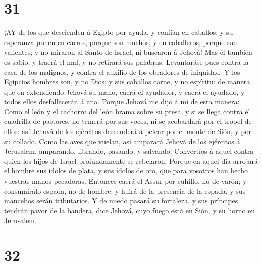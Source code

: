 \hypertarget{section-30}{%
\section{31}\label{section-30}}

 ¡AY de los que descienden á Egipto por ayuda, y confían en
caballos; y su esperanza ponen en carros, porque son muchos, y en
caballeros, porque son valientes; y no miraron al Santo de Israel, ni
buscaron á Jehová!  Mas él también es sabio, y traerá el
mal, y no retirará sus palabras. Levantaráse pues contra la casa de los
malignos, y contra el auxilio de los obradores de iniquidad.
 Y los Egipcios hombres son, y no Dios; y sus caballos
carne, y no espíritu: de manera que en extendiendo Jehová su mano, caerá
el ayudador, y caerá el ayudado, y todos ellos desfallecerán á una.
 Porque Jehová me dijo á mí de esta manera: Como el león y
el cachorro del león brama sobre su presa, y si se llega contra él
cuadrilla de pastores, no temerá por sus voces, ni se acobardará por el
tropel de ellos: así Jehová de los ejércitos descenderá á pelear por el
monte de Sión, y por su collado.  Como las aves que vuelan,
así amparará Jehová de los ejércitos á Jerusalem, amparando, librando,
pasando, y salvando.  Convertíos á aquel contra quien los
hijos de Israel profundamente se rebelaron.  Porque en aquel
día arrojará el hombre sus ídolos de plata, y sus ídolos de oro, que
para vosotros han hecho vuestras manos pecadoras.  Entonces
caerá el Assur por cuhillo, no de varón; y consumirálo espada, no de
hombre; y huirá de la presencia de la espada, y sus mancebos serán
tributarios.  Y de miedo pasará su fortaleza, y sus
príncipes tendrán pavor de la bandera, dice Jehová, cuyo fuego está en
Sión, y su horno en Jerusalem.

\hypertarget{section-31}{%
\section{32}\label{section-31}}


